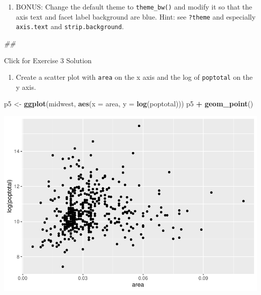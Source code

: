 \documentclass[
]{book}
\newenvironment{Shaded}{\begin{snugshade}}{\end{snugshade}}
\newcommand{\CommentTok}[1]{\textcolor[rgb]{0.56,0.35,0.01}{\textit{#1}}}
\newcommand{\DataTypeTok}[1]{\textcolor[rgb]{0.13,0.29,0.53}{#1}}
\newcommand{\KeywordTok}[1]{\textcolor[rgb]{0.13,0.29,0.53}{\textbf{#1}}}
\newcommand{\NormalTok}[1]{#1}
\newcommand{\OperatorTok}[1]{\textcolor[rgb]{0.81,0.36,0.00}{\textbf{#1}}}
\newcommand{\StringTok}[1]{\textcolor[rgb]{0.31,0.60,0.02}{#1}}
\providecommand{\tightlist}{%
  \setlength{\itemsep}{0pt}\setlength{\parskip}{0pt}}
\begin{document}
\begin{enumerate}
\def\labelenumi{\arabic{enumi}.}
\setcounter{enumi}{5}
\tightlist
\item
  BONUS: Change the default theme to \texttt{theme\_bw()} and modify it so that the axis text and facet label background are blue. Hint: see \texttt{?theme} and especially \texttt{axis.text} and \texttt{strip.background}.
\end{enumerate}

\begin{Shaded}
\begin{Highlighting}[]
\CommentTok{\#\# }
\end{Highlighting}
\end{Shaded}

{Click for Exercise 3 Solution}

\begin{alert}

\begin{enumerate}
\def\labelenumi{\arabic{enumi}.}
\tightlist
\item
  Create a scatter plot with \texttt{area} on the x axis and the log of \texttt{poptotal} on the y axis.
\end{enumerate}

\begin{Shaded}
\begin{Highlighting}[]
\NormalTok{p5 \textless{}{-}}\StringTok{ }\KeywordTok{ggplot}\NormalTok{(midwest, }\KeywordTok{aes}\NormalTok{(}\DataTypeTok{x =}\NormalTok{ area, }\DataTypeTok{y =} \KeywordTok{log}\NormalTok{(poptotal))) }
\NormalTok{p5 }\OperatorTok{+}\StringTok{ }\KeywordTok{geom\_point}\NormalTok{() }
\end{Highlighting}
\end{Shaded}

\includegraphics{R/Rgraphics/figures/unnamed-chunk-222-1.pdf}


\end{alert}
\end{document}
